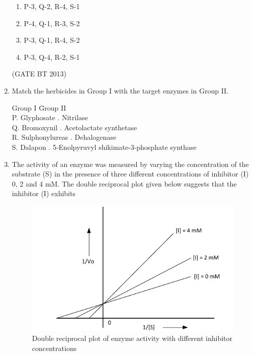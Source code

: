 \documentclass[journal,12pt,onecolumn]{IEEEtran}
\theoremstyle{remark}
\begin{document}
\begin{enumerate}
\begin{enumerate}
    \item P-3, Q-2, R-4, S-1
    \item P-4, Q-1, R-3, S-2
    \item P-3, Q-1, R-4, S-2
    \item P-3, Q-4, R-2, S-1
\end{enumerate} \hfill(GATE BT 2013)

\item 

Match the herbicides in Group I with the target enzymes in Group II.

\begin{tabbing}
Group I \hspace{3.5cm} \= Group II \\
P. Glyphosate . Nitrilase \\
Q. Bromoxynil . Acetolactate synthetase \\
R. Sulphonylureas . Dehalogenase \\
S. Dalapon . 5-Enolpyruvyl shikimate-3-phosphate synthase \\
\end{tabbing}


  \item The activity of an enzyme was measured by varying the concentration of the substrate (S) 
    in the presence of three different concentrations of inhibitor (I) 0, 2 and 4 mM. 
    The double reciprocal plot given below suggests that the inhibitor (I) exhibits

\begin{figure}[htbp]
  \centering
  \includegraphics[width=\columnwidth]{figs/enzyme_plot.png}
  \caption{Double reciprocal plot of enzyme activity with different inhibitor concentrations}
  \label{fig:enzyme_plot}
\end{figure}


\end{enumerate}
\end{document}

